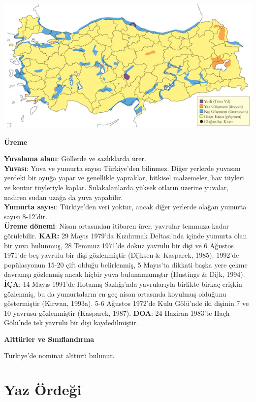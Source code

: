 \documentclass[
  a4paper,
  DIV=11,
  numbers=noendperiod]{scrreprt}
\begin{document}
\includegraphics{images/harita_Page_020.png}

\textbf{Üreme}

\textbf{Yuvalama alanı}: Göllerde ve sazlıklarda ürer.\\
\textbf{Yuvası}: Yuva ve yumurta sayısı Türkiye'den bilinmez. Diğer
yerlerde yuvasını yerdeki bir oyuğa yapar ve genellikle yapraklar,
bitkisel malzemeler, hav tüyleri ve kontur tüyleriyle kaplar.
Sulakalanlarda yüksek otların üzerine yuvalar, nadiren sudan uzağa da
yuva yapabilir.\\
\textbf{Yumurta sayısı}: Türkiye'den veri yoktur, ancak diğer yerlerde
olağan yumurta sayısı 8-12'dir.\\
\textbf{Üreme dönemi}: Nisan ortasından itibaren ürer, yavrular temmuza
kadar görülebilir. \textbf{KAR:} 29 Mayıs 1979'da Kızılırmak Deltası'nda
içinde yumurta olan bir yuva bulunmuş, 28 Temmuz 1971'de dokuz yavrulu
bir dişi ve 6 Ağustos 1971'de beş yavrulu bir dişi gözlenmiştir (Dijksen
\& Kasparek, 1985). 1992'de popülasyonun 15-20 çift olduğu belirlenmiş,
5 Mayıs'ta dikkati başka yere çekme davranışı gözlenmiş ancak hiçbir
yuva bulunamamıştır (Hustings \& Dijk, 1994). \textbf{İÇA}: 14 Mayıs
1991'de Hotamış Sazlığı'nda yavrularıyla birlikte birkaç erişkin
gözlenmiş, bu da yumurtaların en geç nisan ortasında koyulmuş olduğunu
göstermiştir (Kirwan, 1993a). 5-6 Ağustos 1972'de Kulu Gölü'nde iki
dişinin 7 ve 10 yavrusu gözlenmiştir (Kasparek, 1987). \textbf{DOA}: 24
Haziran 1983'te Haçlı Gölü'nde tek yavrulu bir dişi kaydedilmiştir.

\textbf{Alttürler ve Sınıflandırma}

Türkiye'de nominat alttürü bulunur.

\section{Yaz Ördeği}\label{yaz-uxf6rdeux11fi}
\end{document}
